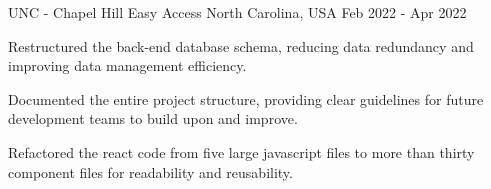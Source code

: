 \begin{cventries}

  \cventry
    {UNC - Chapel Hill} %
    {Easy Access} %
    {North Carolina, USA} %
    {Feb 2022 - Apr 2022} %
    {
      \begin{cvitems} %
        \item {Restructured the back-end database schema, reducing data redundancy and improving data management efficiency.}
        \item {Documented the entire project structure, providing clear guidelines for future development teams to build upon and improve.}
        \item {Refactored the react code from five large javascript files to more than thirty component files for readability and reusability.}
      \end{cvitems}
    }

\end{cventries}
